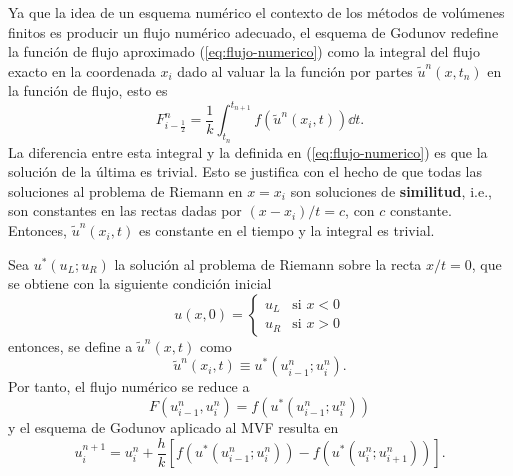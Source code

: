 Ya que la idea de un esquema numérico el contexto de los métodos de volúmenes finitos es producir un flujo numérico adecuado, el esquema de Godunov redefine la función de flujo aproximado (\ref{eq:flujo-numerico}) como la integral del flujo exacto en la coordenada $x_i$ dado al valuar la  la función por partes $\tilde{u}^{n}(x,t_n)$ en la función de flujo, esto es
\begin{equation}
	F_{i-\frac{1}{2}}^{n} = \frac{1}{k}\int_{t_n}^{t_{n+1}}f(\tilde{u}^{n}(x_i,t))\dd{t}.
\end{equation}
La diferencia entre esta integral y la definida en (\ref{eq:flujo-numerico}) es que la solución de la última es trivial. Esto se justifica con el hecho de que todas las soluciones al problema de Riemann en $x=x_{i}$ son soluciones de \textbf{similitud}, i.e., son constantes en las rectas dadas por $(x-x_{i})/t = c$, con $c$ constante. Entonces, $\tilde{u}^{n}(x_{i},t)$ es constante en el tiempo y la integral es trivial.

Sea $u^{*}(u_L; u_R)$ la solución al problema de Riemann sobre la recta $x/t = 0$, que se obtiene con la siguiente condición inicial
\begin{equation}
	u(x,0) = 
	\begin{cases}
		u_L & \text{si } x < 0 \\
		u_R & \text{si } x > 0
	\end{cases}
\end{equation}
entonces, se define a $\tilde{u}^{n}(x,t)$ como
\begin{equation}
	\tilde{u}^{n}(x_{i},t) \equiv u^{*}(u_{i-1}^{n} ; u_{i}^{n}).
\end{equation}
Por tanto, el flujo numérico se reduce a
\begin{equation}
	F(u_{i-1}^{n}, u_{i}^{n}) = f(u^{*}(u_{i-1}^{n} ; u_{i}^{n}))
\end{equation}
y el esquema de Godunov aplicado al MVF resulta en
\begin{equation}
	u_{i}^{n+1} = u_{i}^{n} + \frac{h}{k} \left[f(u^{*}(u_{i-1}^{n} ; u_{i}^{n})) - f(u^{*}(u_{i}^{n} ; u_{i+1}^{n}))\right].
\end{equation}

